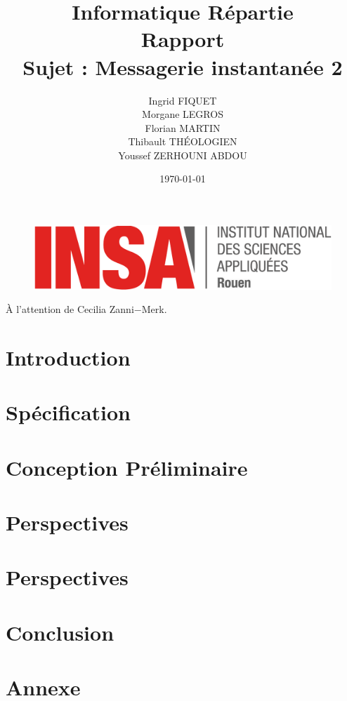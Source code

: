 \documentclass[a4paper,12pt]{article}
\title{Informatique Répartie\\Rapport\\Sujet : Messagerie instantanée 2}
\author{Ingrid FIQUET\\Morgane LEGROS\\Florian MARTIN\\Thibault THÉOLOGIEN\\Youssef ZERHOUNI ABDOU}
\date{\today}
\begin{document}
	\begin{titlepage}
		\vfill
		\begin{figure}
			\includegraphics[scale=0.3]{img/logoINSARouen.png}
		\end{figure}

		\maketitle
		
		\begin{center}
			\addvspace{10mm}
			À l'attention de Cecilia Zanni$-$Merk.
		\end{center}

		\vfill
		\noindent \hrulefill

	\end{titlepage}



\newpage
\tableofcontents{}

\newpage
\part*{Introduction} 
	

\newpage
\part{Spécification}
	
	
\newpage
\part{Conception Préliminaire}
	
	
\newpage
\part{Perspectives}
	

\newpage
\part{Perspectives}
	
	
\newpage
\part*{Conclusion}
	

\newpage
\part*{Annexe}
\end{document}
